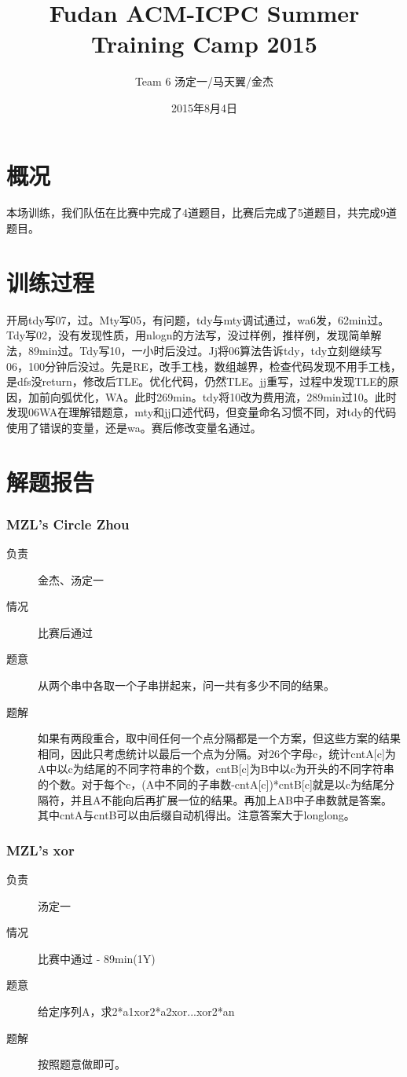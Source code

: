 \documentclass[a4paper, 11pt, nofonts, nocap, fancyhdr]{ctexart}
\title{Fudan ACM-ICPC Summer Training Camp 2015}
\author{Team 6 汤定一/马天翼/金杰}
\date{2015年8月4日}
\newcommand{\problem}[1]{\subsubsection{#1}}
\begin{document}
\maketitle

\section{概况}

本场训练，我们队伍在比赛中完成了4道题目，比赛后完成了5道题目，共完成9道题目。

\section{训练过程}

开局tdy写07，过。Mty写05，有问题，tdy与mty调试通过，wa6发，62min过。Tdy写02，没有发现性质，用nlogn的方法写，没过样例，推样例，发现简单解法，89min过。Tdy写10，一小时后没过。Jj将06算法告诉tdy，tdy立刻继续写06，100分钟后没过。先是RE，改手工栈，数组越界，检查代码发现不用手工栈，是dfs没return，修改后TLE。优化代码，仍然TLE。jj重写，过程中发现TLE的原因，加前向弧优化，WA。此时269min。tdy将10改为费用流，289min过10。此时发现06WA在理解错题意，mty和jj口述代码，但变量命名习惯不同，对tdy的代码使用了错误的变量，还是wa。赛后修改变量名通过。

\section{解题报告}

\problem{MZL's Circle Zhou}

\begin{description}
\item[负责] 金杰、汤定一
\item[情况] 比赛后通过
\item[题意]
从两个串中各取一个子串拼起来，问一共有多少不同的结果。
\item[题解]
如果有两段重合，取中间任何一个点分隔都是一个方案，但这些方案的结果相同，因此只考虑统计以最后一个点为分隔。对26个字母c，统计cntA[c]为A中以c为结尾的不同字符串的个数，cntB[c]为B中以c为开头的不同字符串的个数。对于每个c，(A中不同的子串数-cntA[c])*cntB[c]就是以c为结尾分隔符，并且A不能向后再扩展一位的结果。再加上AB中子串数就是答案。其中cntA与cntB可以由后缀自动机得出。注意答案大于longlong。
\end{description}

\problem{MZL's xor}

\begin{description}
\item[负责] 汤定一
\item[情况] 比赛中通过 - 89min(1Y)
\item[题意]
给定序列A，求2*a1xor2*a2xor...xor2*an
\item[题解]
按照题意做即可。
\end{description}
\end{document}
